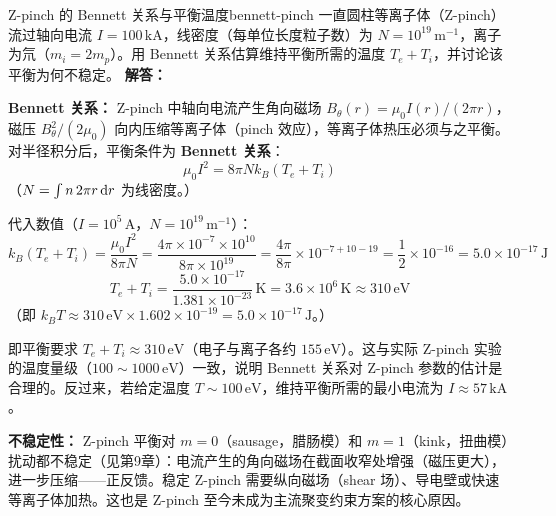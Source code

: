 \begin{example}{Z-pinch 的 Bennett 关系与平衡温度}{bennett-pinch}
一直圆柱等离子体（Z-pinch）流过轴向电流 $I = 100\,\mathrm{kA}$，线密度（每单位长度粒子数）为 $N = 10^{19}\,\mathrm{m^{-1}}$，离子为氘（$m_i = 2m_p$）。用 Bennett 关系估算维持平衡所需的温度 $T_e + T_i$，并讨论该平衡为何不稳定。
\tcblower
\textbf{解答：}

\textbf{Bennett 关系：} Z-pinch 中轴向电流产生角向磁场 $B_\theta(r) = \mu_0 I(r)/(2\pi r)$，磁压 $B_\theta^2/(2\mu_0)$ 向内压缩等离子体（pinch 效应），等离子体热压必须与之平衡。对半径积分后，平衡条件为 \textbf{Bennett 关系}：
\[
\mu_0 I^2 = 8\pi N k_{\!B}(T_e + T_i)
\]
（$N = \int n\,2\pi r\,\mathrm{d} r$ 为线密度。）

代入数值（$I = 10^5\,\mathrm{A}$，$N = 10^{19}\,\mathrm{m^{-1}}$）：
\[
k_{\!B}(T_e+T_i) = \frac{\mu_0 I^2}{8\pi N}
= \frac{4\pi\times10^{-7}\times10^{10}}{8\pi\times10^{19}}
= \frac{4\pi}{8\pi}\times10^{-7+10-19}
= \frac{1}{2}\times10^{-16}
= 5.0\times10^{-17}\,\mathrm{J}
\]
\[
T_e + T_i = \frac{5.0\times10^{-17}}{1.381\times10^{-23}}\,\mathrm{K} = 3.6\times10^{6}\,\mathrm{K} \approx 310\,\mathrm{eV}
\]
（即 $k_{\!B}T \approx 310\,\mathrm{eV}\times1.602\times10^{-19} = 5.0\times10^{-17}\,\mathrm{J}$。）

即平衡要求 $T_e + T_i \approx 310\,\mathrm{eV}$（电子与离子各约 $155\,\mathrm{eV}$）。这与实际 Z-pinch 实验的温度量级（$100\sim1000\,\mathrm{eV}$）一致，说明 Bennett 关系对 Z-pinch 参数的估计是合理的。反过来，若给定温度 $T\sim100\,\mathrm{eV}$，维持平衡所需的最小电流为 $I \approx 57\,\mathrm{kA}$。

\textbf{不稳定性：} Z-pinch 平衡对 $m=0$（sausage，腊肠模）和 $m=1$（kink，扭曲模）扰动都不稳定（见第9章）：电流产生的角向磁场在截面收窄处增强（磁压更大），进一步压缩——正反馈。稳定 Z-pinch 需要纵向磁场（shear 场）、导电壁或快速等离子体加热。这也是 Z-pinch 至今未成为主流聚变约束方案的核心原因。
\end{example}

